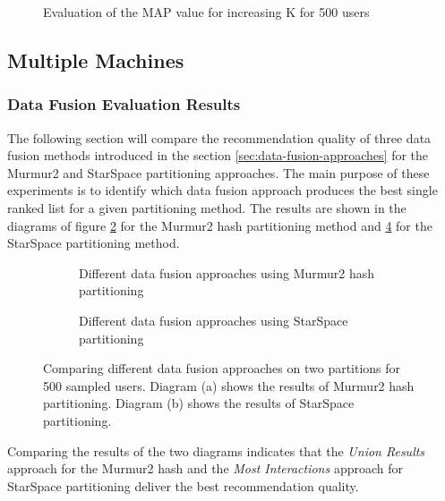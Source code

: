 \begin{figure}[!htb]
    \centering
    
    \caption{Evaluation of the MAP value for increasing K for 500 users}
    \label{plot:single-partition}
\end{figure}

\subsection{Multiple Machines}
\label{subsec:eval-multiple-machines}

\subsubsection{Data Fusion Evaluation Results}
\label{subsubsec:eval-data-fusion}
The following section will compare the recommendation quality of three data fusion methods introduced in the section \ref{sec:data-fusion-approaches} for the Murmur2 and StarSpace partitioning approaches. The main purpose of these experiments is to identify which data fusion approach produces the best single ranked list for a given partitioning method. The results are shown in the diagrams of figure \ref{plot:murmur2-data-fusion} for the Murmur2 hash partitioning method and \ref{plot:star-space-data-fusion} for the StarSpace partitioning method.


\begin{figure}[!htb]
    \centering
    \begin{subfigure}{\textwidth}
        \centering
        
        \caption{Different data fusion approaches using Murmur2 hash partitioning}
        \label{plot:murmur2-data-fusion}
    \end{subfigure}\qquad

    \begin{subfigure}{\textwidth}
        \centering
        
        \caption{Different data fusion approaches using StarSpace partitioning}
        \label{plot:star-space-data-fusion}
    \end{subfigure}\qquad
    \caption{Comparing different data fusion approaches on two partitions for 500 sampled users. Diagram (a) shows the results of Murmur2 hash partitioning. Diagram (b) shows the results of StarSpace partitioning.}
\end{figure}


Comparing the results of the two diagrams indicates that the \emph{Union Results} approach for the Murmur2 hash and the \emph{Most Interactions} approach for StarSpace partitioning deliver the best recommendation quality. 


